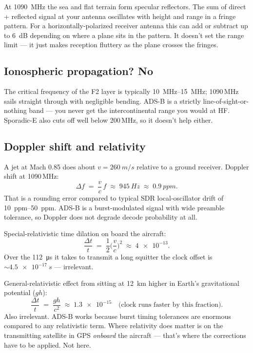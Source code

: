 \documentclass[11pt,a4paper]{article}
\begin{document}
At \SI{1090}{MHz} the sea and flat terrain form specular reflectors.  The
sum of direct + reflected signal at your antenna oscillates with height
and range in a fringe pattern.  For a horizontally-polarized receiver
antenna this can add or subtract up to \SI{6}{dB} depending on where a
plane sits in the pattern.  It doesn't set the range limit --- it just
makes reception fluttery as the plane crosses the fringes.

\subsection{Ionospheric propagation? No}

The critical frequency of the F2 layer is typically
\SIrange{10}{15}{MHz}; 1090\,MHz sails straight through with negligible
bending.  ADS-B is a strictly line-of-sight-or-nothing band --- you
never get the intercontinental range you would at HF.  Sporadic-E also
cuts off well below 200\,MHz, so it doesn't help either.

\subsection{Doppler shift and relativity}

A jet at Mach 0.85 does about $v = \SI{260}{m/s}$ relative to a ground
receiver.  Doppler shift at 1090\,MHz:
\[
\Delta f \;=\; \frac{v}{c}\, f \;\approx\; \SI{945}{Hz}
              \;\approx\; \SI{0.9}{ppm}.
\]
That is a rounding error compared to typical SDR local-oscillator
drift of \SIrange{10}{50}{ppm}.  ADS-B is a burst-modulated signal
with wide preamble tolerance, so Doppler does not degrade decode
probability at all.

\medskip
Special-relativistic time dilation on board the aircraft:
\[
\frac{\Delta t}{t} \;=\; \frac{1}{2}\biggl(\frac{v}{c}\biggr)^{\!2}
\;\approx\; \num{4e-13}.
\]
Over the \SI{112}{\micro s} it takes to transmit a long squitter the
clock offset is $\sim\!\SI{4.5e-17}{s}$ --- irrelevant.

General-relativistic effect from sitting at \SI{12}{km} higher in
Earth's gravitational potential ($g h$):
\[
\frac{\Delta t}{t} \;=\; \frac{g h}{c^{2}}
\;\approx\; \num{1.3e-15}\quad\text{(clock runs faster by this fraction)}.
\]
Also irrelevant.  ADS-B works because burst timing tolerances are
enormous compared to any relativistic term.  Where relativity does
matter is on the transmitting satellite in GPS \emph{onboard} the
aircraft --- that's where the corrections have to be applied.  Not
here.
\end{document}
